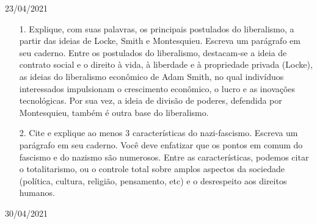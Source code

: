 \documentclass{SchoolBook}
\begin{document}
    \begin{day}{23/04/2021}
        \begin{enumerate}
            \item[1.] Explique, com suas palavras, os principais postulados do liberalismo, a partir das ideias de Locke, Smith e Montesquieu. Escreva um parágrafo em seu caderno.
            \response Entre os postulados do liberalismo, destacam-se a ideia de contrato social e o direito à vida, à liberdade e à propriedade privada (Locke), as ideias do liberalismo econômico de Adam Smith, no qual indivíduos interessados impulsionam o crescimento econômico, o lucro e as inovações tecnológicas.
            Por sua vez, a ideia de divisão de poderes, defendida por Montesquieu, também é outra base do liberalismo.

            \item[2.] Cite e explique ao menos 3 características do nazi-fascismo. Escreva um parágrafo em seu caderno.
            \response Você deve enfatizar que os pontos em comum do fascismo e do nazismo são numerosos. Entre as características, podemos citar o totalitarismo, ou o controle total sobre amplos aspectos da sociedade (política, cultura, religião, pensamento, etc) e o desrespeito aos direitos humanos.
        \end{enumerate}
    \end{day}
    
    \begin{day}{30/04/2021}
        
    \end{day}
\end{document}
